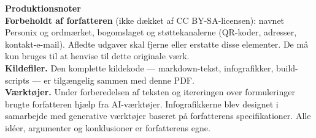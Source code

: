 \clearpage
\thispagestyle{empty}
\begin{flushleft}\small\sffamily
\textbf{Produktionsnoter}\\[1.2em]

\textbf{Forbeholdt af forfatteren} (ikke dækket af CC BY-SA-licensen): navnet
Personix og ordmærket, bogomslaget og støttekanalerne (QR-koder,
adresser, kontakt-e-mail). Afledte udgaver skal fjerne eller erstatte
disse elementer. De må kun bruges til at henvise til dette originale værk.\\[1.2em]

\textbf{Kildefiler.} Den komplette kildekode --- markdown-tekst, infografikker,
build-scripts --- er tilgængelig sammen med denne PDF.\\[1.2em]

\textbf{Værktøjer.} Under forberedelsen af teksten og itereringen over
formuleringer brugte forfatteren hjælp fra AI-værktøjer. Infografikkerne blev designet
i samarbejde med generative værktøjer baseret på forfatterens specifikationer.
Alle idéer, argumenter og konklusioner er forfatterens egne.
\end{flushleft}
\clearpage
